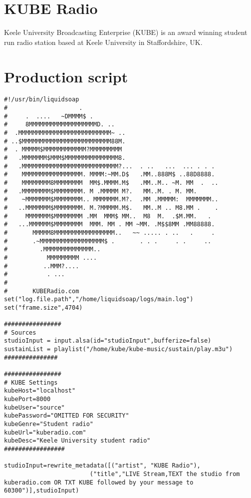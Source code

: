 \section{KUBE Radio}
Keele University Broadcasting Enterprise (KUBE) is an award winning student run radio station based at Keele University in Staffordshire, UK.

\section{Production script}
\begin{verbatim}
#!/usr/bin/liquidsoap
#                    .                                       
#     .  ....   ~DMMMM$ .                                    
#     8MMMMMMMMMMMMMMMMMMMD. ..                              
#  .MMMMMMMMMMMMMMMMMMMMMMMMMM~ ..                           
# ..$MMMMMMMMMMMMMMMMMMMMMMMMM88M.                           
#  . MMMMM$MMMMMMMMMMMM?MMMMMMMMM                            
#   .MMMMMMM$MMM$MMMMMMMMMMMMMMM8.                           
#   .MMMMMMMMMMMMMMMMMMMMMMMMMMM?...  . ..   ...  ... . . .  
#    MMMMMMMMMMMMMMMMM. MMMM:~MM.D$   .MM..888M$ ..88D8888.  
#    MMMMMMMM8MMMMMMMM  MM$.MMMM.M$   .MM..M.. ~M. MM  .  .. 
#   .MMMMMMMM$MMMMMMMM. M .MMMMM M?.   MM..M. . M. MM.       
#    ~MMMMMMM$MMMMMMMM.. MMMMMMM.M?.  .MM .MMMMM:  MMMMMMM.. 
#   ..MMMMMMM$MMMMMMMM. M.?MMMMM.M$.   MM..M .. M8.MM .    . 
#     MMMMMMM$MMMMMMMM .MM  MMM$ MM..  M8  M.  .$M.MM.   .   
#   ...MMMMMM$MMMMMMMM  MMM. MM . MM ~MM. .M$$8MM .MM88888.  
#       MMMMM8MMMMMMMMMMMMMMMMM..   ~~ ..... . ..   .     .  
#       .~MMMMMMMMMMMMMMMMMM$ .       . . .     . .     ..   
#         .MMMMMMMMMMMMMM..                                  
#           MMMMMMMMM ....                                   
#          ..MMM?....                                        
#           . ...                                            
#
#       KUBERadio.com
set("log.file.path","/home/liquidsoap/logs/main.log")
set("frame.size",4704)

################
# Sources
studioInput = input.alsa(id="studioInput",bufferize=false)
sustainList = playlist("/home/kube/kube-music/sustain/play.m3u")
###############

################
# KUBE Settings
kubeHost="localhost"
kubePort=8000
kubeUser="source"
kubePassword="OMITTED FOR SECURITY"
kubeGenre="Student radio"
kubeUrl="kuberadio.com"
kubeDesc="Keele University student radio"
#################

studioInput=rewrite_metadata([("artist", "KUBE Radio"),
                        ("title","LIVE Stream,TEXT the studio from kuberadio.com OR TXT KUBE followed by your message to 60300")],studioInput)




\end{verbatim}
